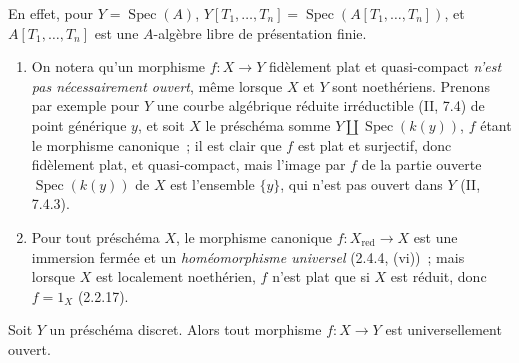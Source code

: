 En effet, pour $Y=\operatorname{Spec}(A)$,
$Y[T_1,\ldots,T_n]=\operatorname{Spec}(A[T_1,\ldots,T_n])$, et
$A[T_1,\ldots,T_n]$ est une $A$-algèbre libre de présentation finie.

\begin{remark}[2.4.8]
\label{IV.2.4.8-fr}
\begin{enumerate}
\item[(i)] On notera qu'un morphisme $f:X\to Y$ fidèlement plat et
quasi-compact \emph{n'est pas nécessairement ouvert}, même lorsque $X$ et $Y$
sont noethériens. Prenons par exemple pour $Y$ une courbe algébrique réduite
irréductible (II, 7.4) de point générique $y$, et soit $X$ le préschéma somme
$Y\amalg\operatorname{Spec}(k(y))$, $f$ étant le morphisme canonique~; il est
clair que $f$ est plat et surjectif, donc fidèlement plat, et quasi-compact,
mais l'image par $f$ de la partie ouverte $\operatorname{Spec}(k(y))$ de $X$
est l'ensemble $\{y\}$, qui n'est pas ouvert dans $Y$ (II, 7.4.3).
\item[(ii)] Pour tout préschéma $X$, le morphisme canonique
$f:X_{\mathrm{red}}\to X$ est une immersion fermée et un
\emph{homéomorphisme universel} (2.4.4, (vi))~; mais lorsque $X$ est
localement noethérien, $f$ n'est plat que si $X$ est réduit, donc
$f=1_X$ (2.2.17).
\end{enumerate}
\end{remark}

\begin{proposition}[2.4.9]
\label{IV.2.4.9-fr}
Soit $Y$ un préschéma discret. Alors tout morphisme $f:X\to Y$ est
universellement ouvert.
\end{proposition}

